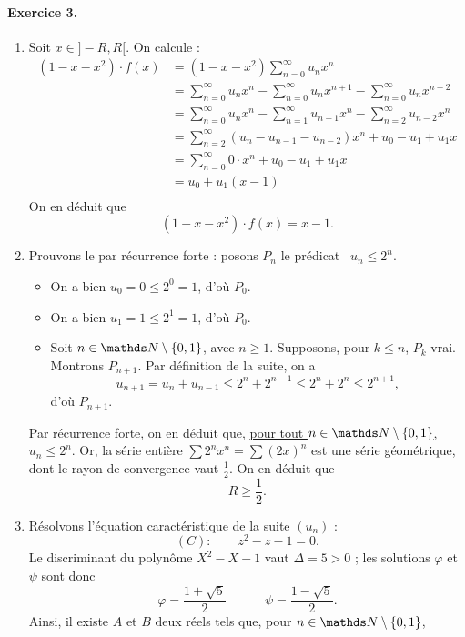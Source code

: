 \documentclass[a4paper]{article}
\begin{document}
	\paragraph{Exercice 3.}
	\begin{enumerate}
		\item Soit $x \in {]-R,R[}$. On calcule :
			\begin{align*}
				(1 - x - x^2) \cdot f(x) &= (1 - x - x^2) \sum_{n=0}^\infty u_n x^n \\
				&= \sum_{n = 0}^\infty u_n x^n - \sum_{n=0}^\infty u_n x^{n+1} -\sum_{n=0}^\infty u_n x^{n+2} \\
				&= \sum_{n=0}^\infty u_n x^n - \sum_{n=1}^\infty u_{n-1} x^n - \sum_{n=2}^\infty u_{n-2} x^n \\
				&= \sum_{n=2}^\infty (u_n - u_{n-1} - u_{n-2})x^n + u_0 - u_1 + u_1 x \\
				&= \sum_{n=0}^\infty 0\cdot x^n + u_0 - u_1 + u_1x \\
				&= u_0 + u_1(x - 1) \\
			\end{align*}
			On en déduit que \[
				\boxed{(1 - x - x^2) \cdot f(x) = x - 1.}
			\]
		\item Prouvons le par récurrence forte : posons $P_n$\/ le prédicat \guillemotleft~$u_n \le 2^n$.~\guillemotright\ 
			\begin{itemize}
				\item On a bien $u_0 = 0 \le 2^0 = 1$, d'où $P_0$.
				\item On a bien $u_1 = 1 \le 2^1 = 1$, d'où $P_0$.
				\item Soit $n \in \N$, avec $n \ge 1$. Supposons, pour $k \le n$, $P_k$ vrai. Montrons $P_{n+1}$.
					Par définition de la suite, on a \[
						u_{n+1} = u_n + u_{n-1} \le 2^n + 2^{n-1} \le 2^n + 2^n \le 2^{n+1}
					,\] d'où $P_{n+1}$.
			\end{itemize}
			Par récurrence forte, on en déduit que, \ul{pour tout $n \in \N$, $u_n \le 2^n$}.
			Or, la série entière $\sum 2^n x^n = \sum (2x)^n$ est une série géométrique, dont le rayon de convergence vaut $\frac{1}{2}$. On en déduit que \[
				\boxed{R \ge \frac{1}{2}.}
			\]
		\item Résolvons l'équation caractéristique de la suite $(u_n)$\/ : \[
					(C) : \quad\quad z^2 - z - 1 = 0
			.\] Le discriminant du polynôme $X^2 - X - 1$\/ vaut $\Delta = 5 > 0$ ; les solutions $\varphi$\/ et $\psi$\/ sont donc \[
				\varphi = \frac{1 + \sqrt{5}}{2} \quad\quad \quad \psi = \frac{1 - \sqrt{5}}{2}
			.\] Ainsi, il existe $A$\/ et $B$\/ deux réels tels que, pour $n \in \N$, \[
\]
\end{enumerate}
\end{document}
